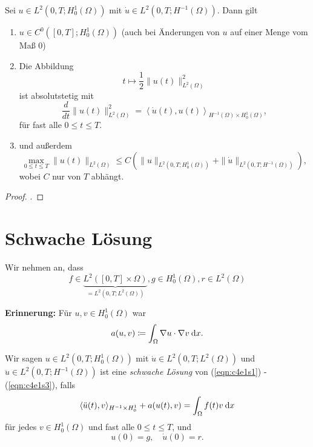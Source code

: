 \documentclass[../skript.tex]{subfiles}
\begin{document}
\begin{theorem}\label{thm:c4e2s6}
	Sei $u\in L^2(0,T;H^1_0(\Omega))$ mit $\dot{u}\in L^2(0,T;H^{-1}(\Omega))$. Dann gilt
	\begin{enumerate}
		\item $u\in C^0([0,T];H^1_0(\Omega))$ (auch bei Änderungen von $u$ auf einer Menge vom Maß $0$)
		\item Die Abbildung 
			\[
				t\mapsto \frac{1}{2} \|u(t)\|_{L^2(\Omega)}^2
			\]
			ist absolutstetig mit
			\[
				\frac{d}{dt} \|u(t)\|_{L^2(\Omega)}^2  = \left\langle \dot{u}(t),u(t)\right\rangle_{H^{-1}(\Omega)\times H^1_0(\Omega)},
			\]
			für fast alle $0\leq t\leq T$.
		\item und außerdem
			\[ 
				\max_{0\leq t\leq T} \|u(t)\|_{L^2(\Omega)} \leq C\left( \|u\|_{L^2(0,T;H^1_0(\Omega))} + \|\dot{u}\|_{L^2(0,T;H^{-1}(\Omega))} \right),
			\]
			wobei $C$ nur von $T$ abhängt.
	\end{enumerate}
\end{theorem}

\begin{proof}
	\cite[S.287]{Evans}.
\end{proof}

\section{Schwache Lösung}\label{sec:c4e3}
Wir nehmen an, dass
\begin{equation}\label{eqn:c4e3s1}
	f\in \underbrace{L^2([0,T]\times\Omega)}_{=L^2(0,T;L^2(\Omega))}, g\in H^1_0(\Omega), r\in L^2(\Omega)
\end{equation}

\textbf{Erinnerung: } Für $u,v\in H^1_0(\Omega)$ war 
\[
	a(u,v) \coloneqq \int_\Omega \nabla u\cdot\nabla v\:\mathrm{d}x.
\]

\begin{definition}\label{def:c4e3s1}
	Wir sagen $u\in L^2(0,T;H^1_0(\Omega))$ mit $\dot{u}\in L^2(0,T;L^2(\Omega))$ und $\ddot{u}\in L^2(0,T;H^{-1}(\Omega))$ ist eine \emph{schwache Lösung} von (\ref{eqn:c4e1s1}) - (\ref{eqn:c4e1s3}), falls
	\begin{equation}\label{eqn:c4e3s2}
		\langle\ddot{u}(t),v\rangle_{H^{-1}\times H^1_0} + a(u(t),v) = \int_\Omega f(t)v\:\mathrm{d}x
	\end{equation}
	für jedes $v\in H^1_0(\Omega)$ und fast alle $0\leq t\leq T$, und 
	\begin{equation}\label{eqn:c4e3s3}
		u(0) = g,\quad\dot{u}(0) = r.
	\end{equation}
\end{definition}
\end{document}
